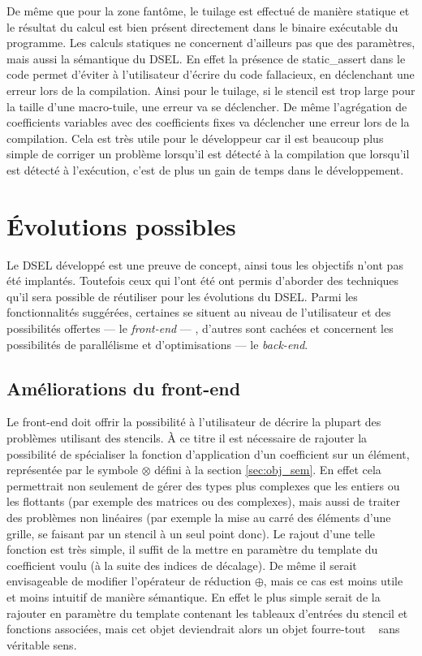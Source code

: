 De même que pour la zone fantôme, le tuilage est effectué de manière statique et le résultat du calcul est bien présent directement dans le binaire exécutable du programme. Les calculs statiques ne concernent d'ailleurs pas que des paramètres, mais aussi la sémantique du DSEL. En effet la présence de \textsf{static\_assert} dans le code permet d'éviter à l'utilisateur d'écrire du code fallacieux, en déclenchant une erreur lors de la compilation. Ainsi pour le tuilage, si le stencil est trop large pour la taille d'une macro-tuile, une erreur va se déclencher. De même l'agrégation de coefficients variables avec des coefficients fixes va déclencher une erreur lors de la compilation. Cela est très utile pour le développeur car il est beaucoup plus simple de corriger un problème lorsqu'il est détecté à la compilation que lorsqu'il est détecté à l'exécution, c'est de plus un gain de temps dans le développement. 


\section{\'Evolutions possibles}
\label{sec:evol_biblio}

Le DSEL développé est une preuve de concept, ainsi tous les objectifs n'ont pas été implantés. Toutefois ceux qui l'ont été ont permis d'aborder des techniques qu'il sera possible de réutiliser pour les évolutions du DSEL. Parmi les fonctionnalités suggérées, certaines se situent au niveau de l'utilisateur et des possibilités offertes --- le \emph{front-end} --- , d'autres sont cachées et concernent les possibilités de parallélisme et d'optimisations --- le \emph{back-end}.

\subsection{Améliorations du front-end}

Le front-end doit offrir la possibilité à l'utilisateur de décrire la plupart des problèmes utilisant des stencils. À ce titre il est nécessaire de rajouter la possibilité de spécialiser la fonction d'application d'un coefficient sur un élément, représentée par le symbole $\otimes$ défini à la section \ref{sec:obj_sem}. En effet cela permettrait non seulement de gérer des types plus complexes que les entiers ou les flottants (par exemple des matrices ou des complexes), mais aussi de traiter des problèmes non linéaires (par exemple la mise au carré des éléments d'une grille, se faisant par un stencil à un seul point donc). Le rajout d'une telle fonction est très simple, il suffit de la mettre en paramètre du template du coefficient voulu (à la suite des indices de décalage). De même il serait envisageable de modifier l'opérateur de réduction $\oplus$, mais ce cas est moins utile et moins intuitif de manière sémantique. En effet le plus simple serait de la rajouter en paramètre du template contenant les tableaux d'entrées du stencil et fonctions associées, mais cet objet deviendrait alors un objet \og fourre-tout \fg~ sans véritable sens. 

